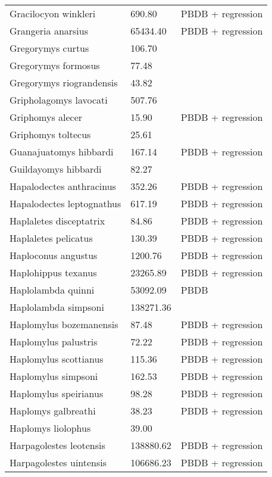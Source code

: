 \begin{center}
\begin{longtable}{p{} p{} p{} }
  Gracilocyon winkleri & 690.80 & PBDB + regression \\ 
  Grangeria anarsius & 65434.40 & PBDB + regression \\ 
  Gregorymys curtus & 106.70 & \cite{Tomiya2013} \\ 
  Gregorymys formosus & 77.48 & \cite{Tomiya2013} \\ 
  Gregorymys riograndensis & 43.82 & \cite{Tomiya2013} \\ 
  Gripholagomys lavocati & 507.76 & \cite{Tomiya2013} \\ 
  Griphomys alecer & 15.90 & PBDB + regression \\ 
  Griphomys toltecus & 25.61 & \cite{Mihlbachler2006} \\ 
  Guanajuatomys hibbardi & 167.14 & PBDB + regression \\ 
  Guildayomys hibbardi & 82.27 & \cite{Tomiya2013} \\ 
  Hapalodectes anthracinus & 352.26 & PBDB + regression \\ 
  Hapalodectes leptognathus & 617.19 & PBDB + regression \\ 
  Haplaletes disceptatrix & 84.86 & PBDB + regression \\ 
  Haplaletes pelicatus & 130.39 & PBDB + regression \\ 
  Haploconus angustus & 1200.76 & PBDB + regression \\ 
  Haplohippus texanus & 23265.89 & PBDB + regression \\ 
  Haplolambda quinni & 53092.09 & PBDB \\ 
  Haplolambda simpsoni & 138271.36 & \cite{Tedford1994} \\ 
  Haplomylus bozemanensis & 87.48 & PBDB + regression \\ 
  Haplomylus palustris & 72.22 & PBDB + regression \\ 
  Haplomylus scottianus & 115.36 & PBDB + regression \\ 
  Haplomylus simpsoni & 162.53 & PBDB + regression \\ 
  Haplomylus speirianus & 98.28 & PBDB + regression \\ 
  Haplomys galbreathi & 38.23 & PBDB + regression \\ 
  Haplomys liolophus & 39.00 & \cite{McKenna2011} \\ 
  Harpagolestes leotensis & 138880.62 & PBDB + regression \\ 
  Harpagolestes uintensis & 106686.23 & PBDB + regression \\ 

\end{longtable}
\end{center}
